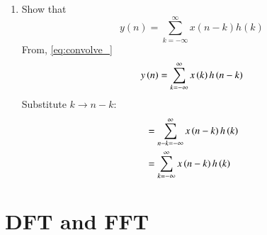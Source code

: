 \documentclass[journal,12pt,twocolumn]{IEEEtran}
\theoremstyle{remark}
\renewcommand\thesection{\arabic{section}}
\numberwithin{equation}{subsection}
\begin{document}
\begin{enumerate}[label=\thesection.\arabic*]
\item Show that
\begin{equation}
y(n) =  \sum_{k=-\infty}^{\infty}x(n-k)h(k)\label{conv}
\end{equation}
\solution
From, \eqref{eq:convolve_}
\begin{align}
y\left(n\right) = \sum_{k=-\infty}^{\infty}x\left(k\right)h\left(n - k\right) 
\end{align}
Substitute $k \to n-k$:
\begin{align}
		  &= \sum_{n - k=-\infty}^{\infty}x\left(n - k\right)h\left(k\right) \\
		  &= \sum_{k=-\infty}^{\infty}x\left(n - k\right)h\left(k\right)
\end{align}
\end{enumerate}

\section{DFT and FFT}
\end{document}
